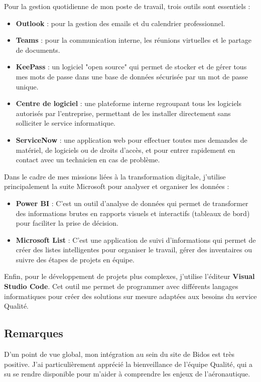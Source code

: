 \newpage

\noindent Pour la gestion quotidienne de mon poste de travail, trois outils sont essentiels :
\begin{itemize}
  \item \textbf{Outlook} : pour la gestion des emails et du calendrier professionnel.
  \item \textbf{Teams} : pour la communication interne, les réunions virtuelles et le partage de documents.
  \item \textbf{KeePass} : un logiciel "open source" qui permet de stocker et de gérer tous mes mots de passe dans une base de données sécurisée par un mot de passe unique.
  \item \textbf{Centre de logiciel} : une plateforme interne regroupant tous les logiciels autorisés par l’entreprise, permettant de les installer directement sans solliciter le service informatique.
  \item \textbf{ServiceNow} : une application web pour effectuer toutes mes demandes de matériel, de logiciels ou de droits d’accès, et pour entrer rapidement en contact avec un technicien en cas de problème.
\end{itemize}

\noindent Dans le cadre de mes missions liées à la transformation digitale, j'utilise principalement la suite Microsoft pour analyser et organiser les données :
\begin{itemize}
  \item \textbf{Power BI} : C'est un outil d'analyse de données qui permet de transformer des informations brutes en rapports visuels et interactifs (tableaux de bord) pour faciliter la prise de décision.
  \item \textbf{Microsoft List} : C'est une application de suivi d'informations qui permet de créer des listes intelligentes pour organiser le travail, gérer des inventaires ou suivre des étapes de projets en équipe.
\end{itemize}

\noindent Enfin, pour le développement de projets plus complexes, j'utilise l'éditeur \textbf{Visual Studio Code}. Cet outil me permet de programmer avec différents langages informatiques pour créer des solutions sur mesure adaptées aux besoins du service Qualité.

\subsection*{Remarques}
{}
D’un point de vue global, mon intégration au sein du site de Bidos est très positive. J’ai particulièrement apprécié la bienveillance de l’équipe Qualité, qui a su se rendre disponible pour m'aider à comprendre les enjeux de l'aéronautique.

